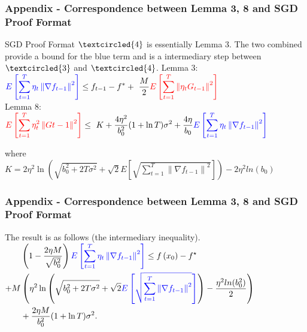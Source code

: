 \documentclass{beamer}
\begin{document}
\begin{frame}
\frametitle{Appendix - Correspondence between Lemma 3, 8 and SGD Proof Format}
SGD Proof Format $\textcircled{4}$ is essentially Lemma 3. The two combined provide a bound for the blue term and is a intermediary step between $\textcircled{3}$ and $\textcircled{4}$.
Lemma 3:
\\
$\begin{aligned} \color{blue}E\left[\sum_{t=1}^T \eta_t\left\|\nabla f_{t-1}\right\|^2\right]\color{black} \leq f_{t-1}-f^* +\ \frac{M}{2} \color{red}E\left[\sum_{t=1}^T\left\|\eta_t G_{t-1}\right\|^2\right]\color{black}\end{aligned}$\\
Lemma 8: \\
$\begin{aligned} \color{red}E\left[\sum_{t=1}^T \eta_t^2\left\|G{t-1}\right\|^2\right]\color{black} \leq \ K+\frac{4 \eta^2}{b_0^2}(1+\ln T) \sigma^2 +\frac{4 \eta}{b_0} \color{blue}E\left[\sum_{t=1}^T \eta_t\left\|\nabla f_{t-1}\right\|^2\right]\color{black}
\end{aligned}$ \par\vspace{3mm} where \\
$K=2 \eta^2 \ln \left(\sqrt{b_0^2+2 T \sigma^2}+\sqrt{2} E\left[\sqrt{\sum_{t=1}^T\left\|\nabla f_{t-1}\right\|^2}\right]\right)-2\eta^2 ln(b_0)$
\end{frame}

\begin{frame}
\frametitle{Appendix - Correspondence between Lemma 3, 8 and SGD Proof Format}
The result is as follows (the intermediary inequality).\\
$\begin{aligned} & \left(1-\frac{2 \eta M}{\sqrt{b_0^2}}\right) \color{blue}E\left[\sum_{t=1}^T \eta_t\left\|\nabla f_{t-1}\right\|^2\right] \color{black}\leq f\left(x_0\right)-f^{\star} \\  +M &\left(\eta^2 \ln \left(\sqrt{b_0^2+2 T \sigma^2}+\sqrt{2} \color{blue}E\left[\sqrt{\sum_{t=1}^T \left\|\nabla f_{t-1}\right\|^2}\right]\color{black}\right)-\frac{\eta^2 ln(b_0^2)}{2}\right) \\ & +\frac{2 \eta M}{b_0^2}(1+\ln T) \sigma^2 .\end{aligned}$\par
\end{frame}
\end{document}
